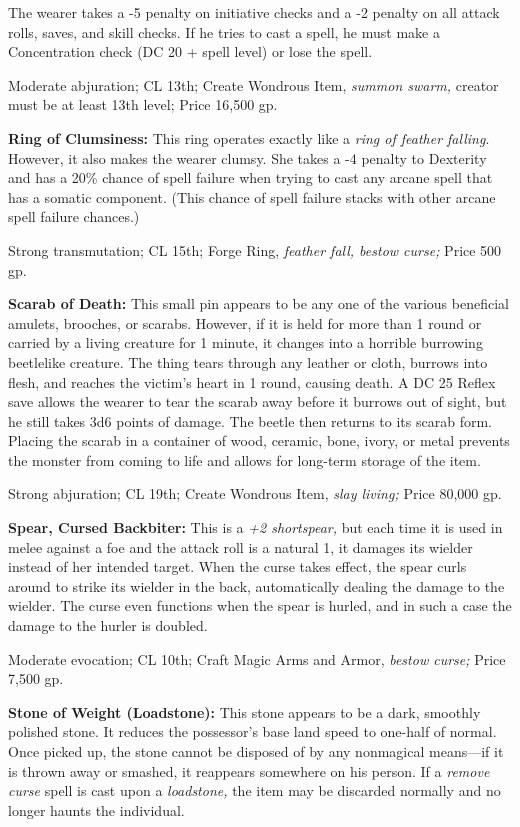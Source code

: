 \documentclass{article}
\begin{document}
The wearer takes a -5 penalty on initiative checks and a -2 penalty on all attack 
rolls, saves, and skill checks. If he tries to cast a spell, he must make a Concentration 
check (DC 20 + spell level) or lose the spell.

Moderate abjuration; CL 13th; Create Wondrous Item, \textit{summon swarm, }creator 
must be at least 13th level; Price 16,500 gp.

\textbf{Ring of Clumsiness:} This ring operates exactly like a \textit{ring of 
feather falling}. However, it also makes the wearer clumsy. She takes a -4 penalty 
to Dexterity and has a 20\% chance of spell failure when trying to cast any arcane 
spell that has a somatic component. (This chance of spell failure stacks with other 
arcane spell failure chances.)

Strong transmutation; CL 15th; Forge Ring, \textit{feather fall, bestow curse; 
}Price 500 gp.

\textbf{Scarab of Death: }This small pin appears to be any one of the various beneficial 
amulets, brooches, or scarabs. However, if it is held for more than 1 round or 
carried by a living creature for 1 minute, it changes into a horrible burrowing 
beetlelike creature. The thing tears through any leather or cloth, burrows into 
flesh, and reaches the victim's heart in 1 round, causing death. A DC 25 Reflex 
save allows the wearer to tear the scarab away before it burrows out of sight, 
but he still takes 3d6 points of damage. The beetle then returns to its scarab 
form. Placing the scarab in a container of wood, ceramic, bone, ivory, or metal 
prevents the monster from coming to life and allows for long-term storage of the 
item.

Strong abjuration; CL 19th; Create Wondrous Item, \textit{slay living; }Price 80,000 
gp.

\textbf{Spear, Cursed Backbiter:} This is a \textit{+2 shortspear, }but each time 
it is used in melee against a foe and the attack roll is a natural 1, it damages 
its wielder instead of her intended target. When the curse takes effect, the spear 
curls around to strike its wielder in the back, automatically dealing the damage 
to the wielder. The curse even functions when the spear is hurled, and in such 
a case the damage to the hurler is doubled.

Moderate evocation; CL 10th; Craft Magic Arms and Armor, \textit{bestow curse; 
}Price 7,500 gp.

\textbf{Stone of Weight (Loadstone):} This stone appears to be a dark, smoothly 
polished stone. It reduces the possessor's base land speed to one-half of normal. 
Once picked up, the stone cannot be disposed of by any nonmagical means---if it 
is thrown away or smashed, it reappears somewhere on his person. If a \textit{remove 
curse }spell is cast upon a \textit{loadstone, }the item may be discarded normally 
and no longer haunts the individual.
\end{document}
